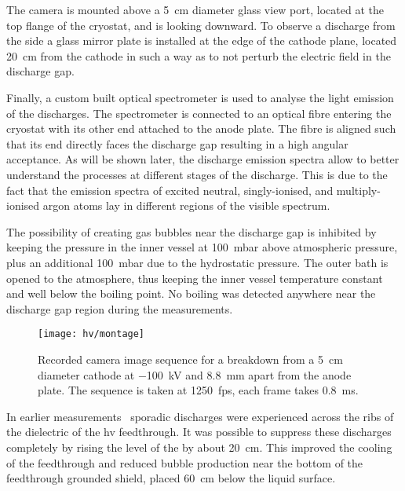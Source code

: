 The camera is mounted above a \SI{5}{\centi\metre} diameter glass view port, located at the top flange of the cryostat, and is looking downward.
To observe a discharge from the side a glass mirror plate is installed at the edge of the cathode plane, located \SI{20}{\centi\metre} from the cathode in such a way as to not perturb the electric field in the discharge gap. 

Finally, a custom built optical spectrometer is used to analyse the light emission of the discharges.
The spectrometer is connected to an optical fibre entering the cryostat with its other end attached to the anode plate.
The fibre is aligned such that its end directly faces the discharge gap resulting in a high angular acceptance.
As will be shown later, the discharge emission spectra allow to better understand the processes at different stages of the discharge.
This is due to the fact that the emission spectra of excited neutral, singly-ionised, and multiply-ionised argon atoms lay in different regions of the visible spectrum.

The possibility of creating gas bubbles near the discharge gap is inhibited by keeping the pressure in the inner vessel at \SI{100}{\milli\bar} above atmospheric pressure, plus an additional \SI{100}{\milli\bar} due to the hydrostatic pressure.
The outer bath is opened to the atmosphere, thus keeping the inner vessel temperature constant and well below the boiling point.
No boiling was detected anywhere near the discharge gap region during the measurements.

\begin{figure}[htb]
	\centering	
	\texttt{[image: hv/montage]}
	\caption[ test high-speed footage]{%
		Recorded camera image sequence for a breakdown from a \SI{5}{\centi\metre} diameter cathode at \SI{-100}{\kilo\volt} and \SI{8.8}{\milli\metre} apart from the anode plate.
		The sequence is taken at \SI{1250}{fps}, each frame takes \SI{0.8}{\milli\second}.
	}
	\label{fig:hv_images}
\end{figure}

In earlier measurements~\cite{breakdown_14} sporadic discharges were experienced across the ribs of the dielectric of the \gls{hv} feedthrough.
It was possible to suppress these discharges completely by rising the level of the \lar{} by about \SI{20}{\centi\metre}.
This improved the cooling of the feedthrough and reduced bubble production near the bottom of the feedthrough grounded shield, placed \SI{60}{\centi\metre} below the liquid surface. 

